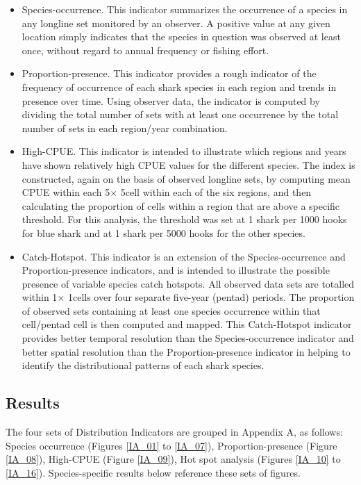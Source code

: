 \documentclass[12pt]{SCreport}
\begin{document}
\begin{itemize}
\item	Species-occurrence.  This indicator summarizes the occurrence of a species in any longline set monitored by an observer.  A positive value at any given location simply indicates that the species in question was observed at least once, without regard to annual frequency or fishing effort.

\item	Proportion-presence.  This indicator provides a rough indicator of the frequency of occurrence of each shark species in each region and trends in presence over time.  Using observer data, the indicator is computed by dividing the total number of sets with at least one occurrence by the total number of sets in each region/year combination.
\item	High-CPUE.  This indicator is intended to illustrate which regions and years have shown relatively high CPUE values for the different species.  The index is constructed, again on the basis of observed longline sets, by computing mean CPUE within each 5\degree $\times$ 5\degree cell within each of the six regions, and then calculating the proportion of cells within a region that are above a specific threshold.  For this analysis, the threshold was set at 1 shark per 1000 hooks for blue shark and at 1 shark per 5000 hooks for the other species.
\item	Catch-Hotspot.  This indicator is an extension of the Species-occurrence and Proportion-presence indicators, and is intended to illustrate the possible presence of variable species catch hotspots.  All observed data sets are totalled within 1\degree $\times$ 1\degree cells over four separate five-year (pentad) periods.  The proportion of observed sets containing at least one species occurrence within that cell/pentad cell is then computed and mapped.  This Catch-Hotspot indicator provides better temporal resolution than the Species-occurrence indicator and better spatial resolution than the Proportion-presence indicator in helping to identify the distributional patterns of each shark species.
\end{itemize}



      \subsection{Results}
      The four sets of Distribution Indicators are grouped in Appendix A, as follows: Species occurrence (Figures \ref{IA_01} to \ref{IA_07}), Proportion-presence (Figure \ref{IA_08}), High-CPUE (Figure \ref{IA_09}), Hot spot analysis (Figures \ref{IA_10} to \ref{IA_16}).  Species-specific results below reference these sets of figures.
      
\end{document}
